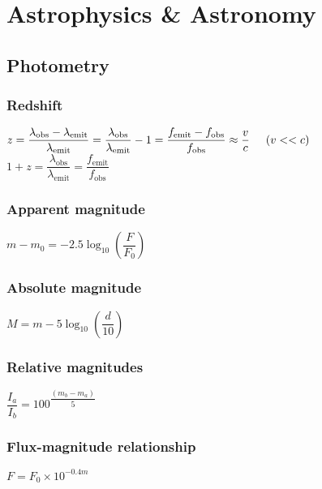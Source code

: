 \chapter{Astrophysics \& Astronomy}

	\section{Photometry}



\subsection{Redshift}
\begin{itemize}
\itemt \( z = \dfrac{\lambda_\mathrm{obs} - \lambda_\mathrm{emit}}{\lambda_\mathrm{emit}} = \dfrac{\lambda_\mathrm{obs}}{\lambda_\mathrm{emit}} - 1 =\dfrac{f_\mathrm{emit} - f_\mathrm{obs}}{f_\mathrm{obs}} \approx \dfrac{v}{c}\tab[0.5cm] (v<<c) \)
\itemt \( 1+z = \dfrac{\lambda_\mathrm{obs}}{\lambda_\mathrm{emit}} = \dfrac{f_\mathrm{emit}}{f_\mathrm{obs}} \)
\end{itemize}

\subsection{Apparent magnitude}	
\begin{itemize}
\itemt \( m-m_0=-2.5\log_{10} \left(\dfrac{F}{F_0}\right) \)
\end{itemize}

\subsection{Absolute magnitude}
\begin{itemize}
\itemt \( M = m - 5 \log_{10} \left(\dfrac{d}{10}\right) \)
\end{itemize}

\subsection{Relative magnitudes}
\begin{itemize}
\itemt \( \dfrac{I_a}{I_b} = 100^{\dfrac{(m_b-m_a)}{5}} \)
\end{itemize}

\subsection{Flux-magnitude relationship}
\begin{itemize}
\itemt \( F = F_0\times 10^{-0.4m} \)
\end{itemize}			

